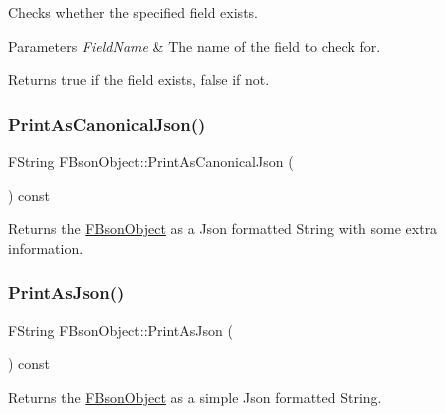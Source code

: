 Checks whether the specified field exists.


\begin{DoxyParams}{Parameters}
{\em Field\+Name} & The name of the field to check for. \\
\hline
\end{DoxyParams}
\begin{DoxyReturn}{Returns}
true if the field exists, false if not. 
\end{DoxyReturn}
\mbox{\label{class_f_bson_object_a8d8d23a9c2887b98a115dcb59ec4d8e2}} 
\subsubsection{\texorpdfstring{Print\+As\+Canonical\+Json()}{PrintAsCanonicalJson()}}
{\footnotesize\ttfamily F\+String F\+Bson\+Object\+::\+Print\+As\+Canonical\+Json (\begin{DoxyParamCaption}{ }\end{DoxyParamCaption}) const}

\begin{DoxyReturn}{Returns}
the \mbox{\hyperlink{class_f_bson_object}{F\+Bson\+Object}} as a Json formatted String with some extra information. 
\end{DoxyReturn}
\mbox{\label{class_f_bson_object_abe06191c8b6df93b07fd66d582194608}} 
\subsubsection{\texorpdfstring{Print\+As\+Json()}{PrintAsJson()}}
{\footnotesize\ttfamily F\+String F\+Bson\+Object\+::\+Print\+As\+Json (\begin{DoxyParamCaption}{ }\end{DoxyParamCaption}) const}

\begin{DoxyReturn}{Returns}
the \mbox{\hyperlink{class_f_bson_object}{F\+Bson\+Object}} as a simple Json formatted String. 
\end{DoxyReturn}
\mbox{\label{class_f_bson_object_ac96a387909bdadff289a513094ec1aad}} 
